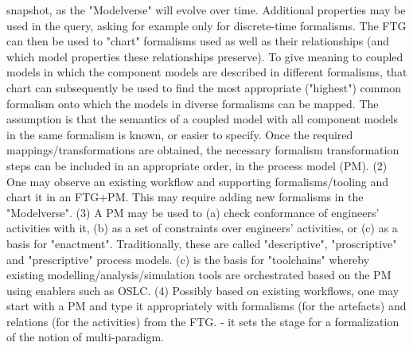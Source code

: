 snapshot, as the "Modelverse" will evolve over time.
      Additional properties may be used in the query, asking for example only 
for discrete-time formalisms.
      The FTG can then be used to "chart" formalisms used as well as their 
relationships (and which model properties
      these relationships preserve). To give meaning to coupled models in which 
the component models are described in
      different formalisms, that chart can subsequently be used to find the most 
appropriate ("highest") common formalism onto which
      the models in diverse formalisms can be mapped. The assumption is that the 
semantics of a coupled model with
      all component models in the same formalism is known, or easier to specify.
      Once the required mappings/transformations are obtained, the necessary 
formalism transformation steps can be
      included in an appropriate order, in the process model (PM).
  (2) One may observe an existing workflow and supporting formalisms/tooling and 
chart it in an FTG+PM.
      This may require adding new formalisms in the "Modelverse".
  (3) A PM may be used to (a) check conformance of engineers' activities with 
it, (b) as a set of constraints
      over engineers' activities, or (c) as a basis for "enactment".
      Traditionally, these are called "descriptive", "proscriptive" and 
"prescriptive" process models.
      (c) is the basis for "toolchains" whereby existing 
modelling/analysis/simulation tools are orchestrated
      based on the PM using enablers such as OSLC.
  (4) Possibly based on existing workflows, one may start with a PM and type it 
appropriately with formalisms (for the
      artefacts) and relations (for the activities) from the FTG.
- it sets the stage for a formalization of the notion of multi-paradigm. 



